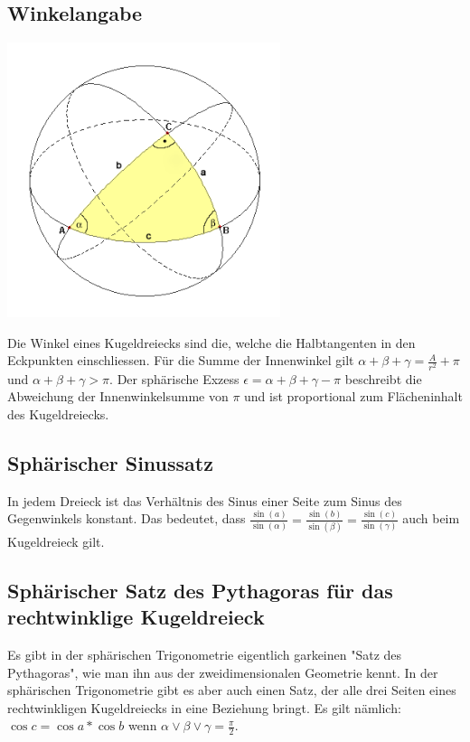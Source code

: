 \documentclass[12pt]{scrartcl}
\begin{document}
\subsection{Winkelangabe}

	\begin{center}
		\includegraphics[width=8cm]{Bilder/kugel2.png}
	\end{center}	

Die Winkel eines Kugeldreiecks sind die, welche die Halbtangenten in den Eckpunkten einschliessen. 
Für die Summe der Innenwinkel gilt $\alpha+\beta+\gamma = \frac{A}{r^2} + \pi$ und
$\alpha+\beta+\gamma > \pi$.
Der sphärische Exzess $\epsilon = \alpha+\beta+\gamma - \pi$ beschreibt die Abweichung der Innenwinkelsumme von $\pi$ und ist proportional zum Flächeninhalt des Kugeldreiecks.

\subsection{Sphärischer Sinussatz}
In jedem Dreieck ist das Verhältnis des Sinus einer Seite zum Sinus des Gegenwinkels konstant. 
Das bedeutet, dass $\frac{\sin (a)}{\sin (\alpha)} =\frac{\sin (b)}{\sin (\beta)} = \frac{\sin (c)}{\sin (\gamma)} $ auch beim Kugeldreieck gilt.

\subsection{Sphärischer Satz des Pythagoras für das rechtwinklige Kugeldreieck}
Es gibt in der sphärischen Trigonometrie eigentlich garkeinen "Satz des Pythagoras", wie man ihn aus der zweidimensionalen Geometrie kennt.
In der sphärischen Trigonometrie gibt es aber auch einen Satz, der alle drei Seiten eines rechtwinkligen Kugeldreiecks in eine Beziehung bringt. 
Es gilt nämlich: $\cos c = \cos a * \cos b$ wenn $\alpha \lor \beta \lor \gamma = \frac{\pi}{2} $.
\end{document}
